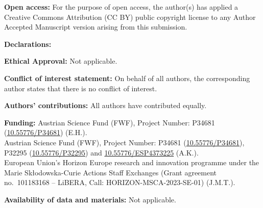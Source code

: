 \documentclass[english,a4paper,11pt]{amsart}
\theoremstyle{plain}
\theoremstyle{definition}
\theoremstyle{remark}
\numberwithin{equation}{section}
\begin{document}
\noindent
\textbf{Open access:} For the purpose of open access, the author(s) has applied a Creative Commons Attribution (CC BY) public copyright license to any Author Accepted Manuscript version arising from this submission.

\medskip\noindent	\textbf{Declarations:}




\noindent 	\textbf{Ethical Approval:}   Not applicable.

\noindent  \textbf{Conflict of interest statement: } On behalf of all authors, the corresponding author states that there is no conflict of interest.



\noindent 	\textbf{Authors' contributions: } All authors have contributed equally.

\noindent 	\textbf{Funding:}  Austrian Science Fund (FWF), Project Number: P34681 (\href{https://www.fwf.ac.at/en/research-radar/10.55776/P34681}{10.55776/P34681}) (E.H.).\\
Austrian Science Fund (FWF), Project Number: P34681 (\href{https://www.fwf.ac.at/en/research-radar/10.55776/P34681}{10.55776/P34681}), P32295 (\href{https://www.fwf.ac.at/en/research-radar/10.55776/P32295}{10.55776/P32295})  and \href{https://www.fwf.ac.at/forschungsradar/10.55776/ESP4373225}{10.55776/ESP4373225} (A.K.).\\
European Union's Horizon Europe research and innovation programme under the Marie Sk\l{}odowska-Curie Actions Staff Exchanges (Grant agreement no.~101183168 -- LiBERA, Call: HORIZON-MSCA-2023-SE-01) (J.M.T.).

\noindent 	\textbf{Availability of data and materials: } Not applicable.
\end{document}
